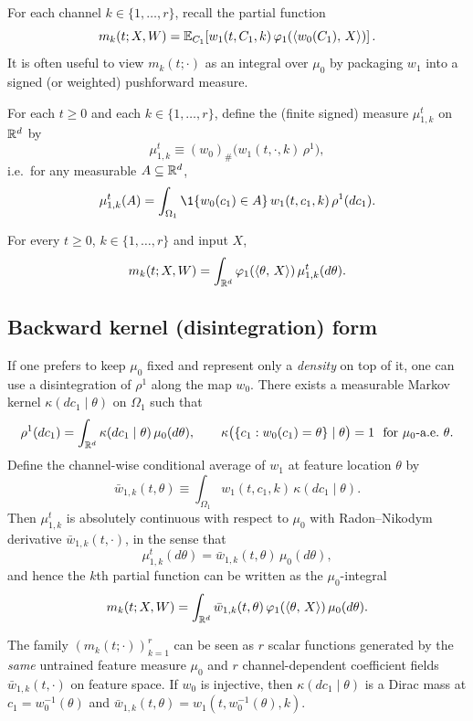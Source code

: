 For each channel $k\in\{1,\dots,r\}$, recall the partial function
\[
m_k(t;X,W)=\mathbb{E}_{C_1}\!\left[w_1(t,C_1,k)\,\varphi_1(\left\langle w_0(C_1),\,X \right\rangle)\right].
\]
It is often useful to view $m_k(t;\cdot)$ as an integral over $\mu_0$ by packaging $w_1$ into a signed (or weighted) pushforward measure.

\begin{definition}\label{def:mu-k}
For each $t\ge 0$ and each $k\in\{1,\dots,r\}$, define the (finite signed) measure $\mu_{1,k}^t$ on $\mathbb{R}^d$ by
\[
\mu_{1,k}^t \equiv (w_0)_{\#}\big(w_1(t,\cdot,k)\,\rho^1\big),
\]
i.e.\ for any measurable $A\subseteq \mathbb{R}^d$,
\[
\mu_{1,k}^t(A)=\int_{\Omega_1}\1\{w_0(c_1)\in A\}\,w_1(t,c_1,k)\,\rho^1(dc_1).
\]
\end{definition}

\begin{lemma}\label{lem:mk-pushforward}
For every $t\ge 0$, $k\in\{1,\dots,r\}$ and input $X$,
\[
m_k(t;X,W)=\int_{\mathbb{R}^d}\varphi_1(\left\langle \theta,\,X \right\rangle)\,\mu_{1,k}^t(d\theta).
\]
\end{lemma}

\subsection{Backward kernel (disintegration) form}

If one prefers to keep $\mu_0$ fixed and represent only a \emph{density} on top of it, one can use a disintegration of $\rho^1$ along the map $w_0$.
There exists a measurable Markov kernel $\kappa(d c_1\mid \theta)$ on $\Omega_1$ such that
\[
\rho^1(dc_1)=\int_{\mathbb{R}^d}\kappa(dc_1\mid \theta)\,\mu_0(d\theta),\qquad
\kappa\big(\{c_1: w_0(c_1)=\theta\}\mid \theta\big)=1\ \ \text{for }\mu_0\text{-a.e.\ }\theta.
\]
Define the channel-wise conditional average of $w_1$ at feature location $\theta$ by
\[
\bar w_{1,k}(t,\theta)\equiv \int_{\Omega_1} w_1(t,c_1,k)\,\kappa(dc_1\mid \theta).
\]
Then $\mu_{1,k}^t$ is absolutely continuous with respect to $\mu_0$ with Radon--Nikodym derivative $\bar w_{1,k}(t,\cdot)$, in the sense that
\[
\mu_{1,k}^t(d\theta)=\bar w_{1,k}(t,\theta)\,\mu_0(d\theta),
\]
and hence the $k$th partial function can be written as the $\mu_0$-integral
\[
m_k(t;X,W)=\int_{\mathbb{R}^d}\bar w_{1,k}(t,\theta)\,\varphi_1(\left\langle \theta,\,X \right\rangle)\,\mu_0(d\theta).
\]

\begin{remark}
The family $(m_k(t;\cdot))_{k=1}^r$ can be seen as $r$ scalar functions generated by the \emph{same} untrained feature measure $\mu_0$ and $r$ channel-dependent coefficient fields $\bar w_{1,k}(t,\cdot)$ on feature space.
If $w_0$ is injective, then $\kappa(dc_1\mid \theta)$ is a Dirac mass at $c_1=w_0^{-1}(\theta)$ and $\bar w_{1,k}(t,\theta)=w_1(t,w_0^{-1}(\theta),k)$.
\end{remark}

